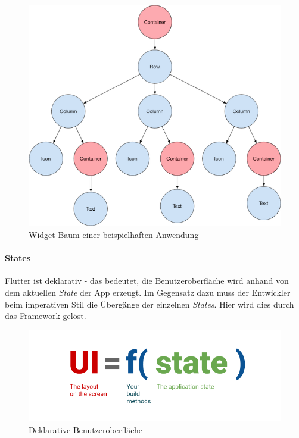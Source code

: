 \begin{figure}[tbt]
	\begin{center}
		\includegraphics[scale=0.5]{Theoretische_Grundlagen/images/flutter_widget_tree.png}
	\end{center}
	\caption{Widget Baum einer beispielhaften Anwendung \protect \footnotemark}
	\label{fig:flutter_widget_tree}
\end{figure}
	

\paragraph{States}
Flutter ist deklarativ - das bedeutet, die Benutzeroberfläche wird anhand von dem aktuellen \textit{State} der App erzeugt. Im Gegensatz dazu muss der Entwickler beim imperativen Stil die Übergänge der einzelnen \textit{States}. Hier wird dies durch das Framework gelöst.
	
\begin{figure}[H]
	\begin{center}
		\includegraphics[scale=0.4]{Theoretische_Grundlagen/images/flutter_state.png}
	\end{center}
	\caption{Deklarative Benutzeroberfläche \protect \footnotemark}
	\label{fig:flutter_state}
\end{figure}







